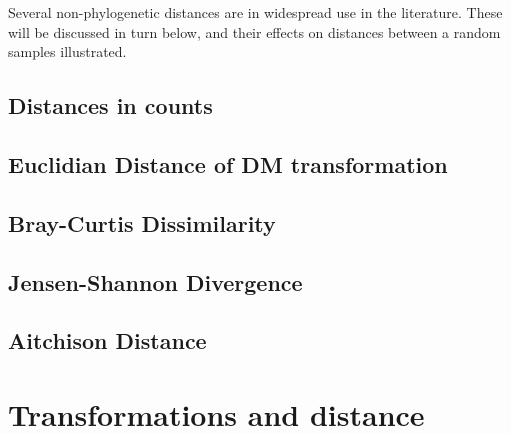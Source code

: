 Several non-phylogenetic distances are in widespread use in the literature. These will be discussed in turn below, and their effects on distances between a random samples illustrated.

\subsection{Distances in counts}
\subsection{Euclidian Distance of DM transformation}
\subsection{Bray-Curtis Dissimilarity}
\subsection{Jensen-Shannon Divergence}
\subsection{Aitchison Distance}
\section{Transformations and distance} 



